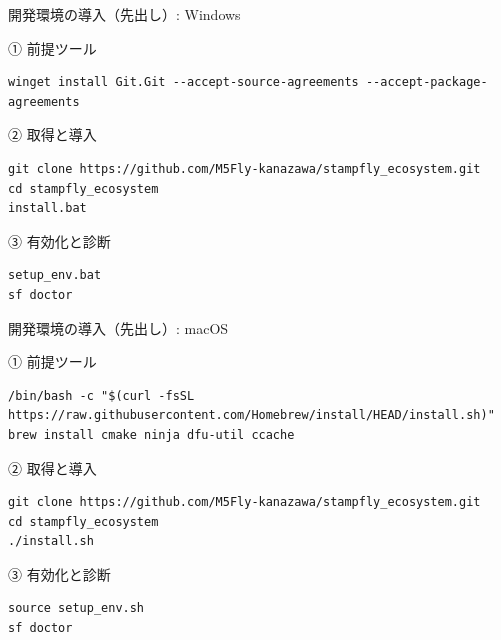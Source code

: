 \begin{frame}[fragile]{開発環境の導入（先出し）: Windows}
  \begin{exampleblock}{① 前提ツール}
    \begin{lstlisting}[style=sfbash, numbers=none, basicstyle=\ttfamily\scriptsize, aboveskip=1pt, belowskip=1pt, alsoletter={-}]
winget install Git.Git --accept-source-agreements --accept-package-agreements
    \end{lstlisting}
  \end{exampleblock}
  \begin{exampleblock}{② 取得と導入}
    \begin{lstlisting}[style=sfbash, numbers=none, basicstyle=\ttfamily\scriptsize, aboveskip=1pt, belowskip=1pt]
git clone https://github.com/M5Fly-kanazawa/stampfly_ecosystem.git
cd stampfly_ecosystem
install.bat
    \end{lstlisting}
  \end{exampleblock}
  \begin{exampleblock}{③ 有効化と診断}
    \begin{lstlisting}[style=sfbash, numbers=none, basicstyle=\ttfamily\scriptsize, aboveskip=1pt, belowskip=1pt]
setup_env.bat
sf doctor
    \end{lstlisting}
  \end{exampleblock}
\end{frame}

\begin{frame}[fragile]{開発環境の導入（先出し）: macOS}
  \begin{exampleblock}{① 前提ツール}
    \begin{lstlisting}[style=sfbash, numbers=none, basicstyle=\ttfamily\scriptsize, aboveskip=1pt, belowskip=1pt]
/bin/bash -c "$(curl -fsSL https://raw.githubusercontent.com/Homebrew/install/HEAD/install.sh)"
brew install cmake ninja dfu-util ccache
    \end{lstlisting}
  \end{exampleblock}
  \begin{exampleblock}{② 取得と導入}
    \begin{lstlisting}[style=sfbash, numbers=none, basicstyle=\ttfamily\scriptsize, aboveskip=1pt, belowskip=1pt]
git clone https://github.com/M5Fly-kanazawa/stampfly_ecosystem.git
cd stampfly_ecosystem
./install.sh
    \end{lstlisting}
  \end{exampleblock}
  \begin{exampleblock}{③ 有効化と診断}
    \begin{lstlisting}[style=sfbash, numbers=none, basicstyle=\ttfamily\scriptsize, aboveskip=1pt, belowskip=1pt]
source setup_env.sh
sf doctor
    \end{lstlisting}
  \end{exampleblock}
\end{frame}


